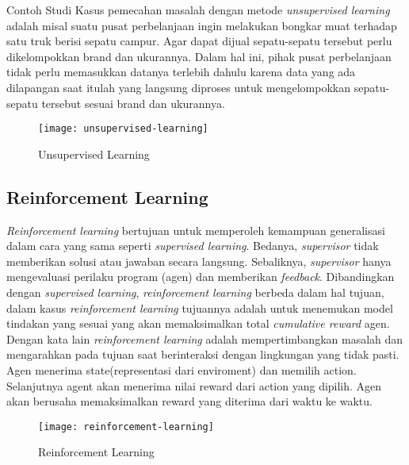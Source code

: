 Contoh Studi Kasus pemecahan masalah dengan metode \emph{unsupervised learning} adalah misal suatu pusat perbelanjaan ingin melakukan bongkar muat terhadap satu truk berisi sepatu campur.
Agar dapat dijual sepatu-sepatu tersebut perlu dikelompokkan brand dan ukurannya.
Dalam hal ini, pihak pusat perbelanjaan tidak perlu memasukkan datanya terlebih dahulu karena data yang ada dilapangan saat itulah yang langsung diproses untuk mengelompokkan sepatu-sepatu tersebut sesuai brand dan ukurannya\cite{AlFahriz}.
\begin{figure}[h]
    \centering
    \texttt{[image: unsupervised-learning]}
    \caption{Unsupervised Learning \cite{AlFahriz}}
\end{figure}

\subsection{Reinforcement Learning}
\emph{Reinforcement learning} bertujuan untuk memperoleh kemampuan generalisasi dalam cara yang sama seperti \emph{supervised learning}.
Bedanya, \emph{supervisor} tidak memberikan solusi atau jawaban secara langsung. Sebaliknya, \emph{supervisor} hanya mengevaluasi perilaku program (agen) dan memberikan \emph{feedback}.
Dibandingkan dengan \emph{supervised learning}, \emph{reinforcement learning} berbeda dalam hal tujuan, dalam kasus \emph{reinforcement learning} tujuannya adalah untuk menemukan model tindakan yang sesuai yang akan memaksimalkan total \emph{cumulative reward} agen.
Dengan kata lain
\emph{reinforcement learning} adalah mempertimbangkan masalah dan mengarahkan
pada tujuan saat berinteraksi dengan lingkungan yang tidak pasti. Agen
menerima state(representasi dari enviroment) dan memilih action. Selanjutnya
agent akan menerima nilai reward dari action yang dipilih. Agen akan berusaha
memaksimalkan reward yang diterima dari waktu ke waktu.
\begin{figure}[h]
    \centering
    \texttt{[image: reinforcement-learning]}
    \caption{Reinforcement Learning \cite{TWDSReinforcementLearning}}
\end{figure}